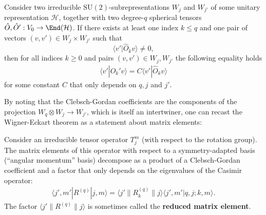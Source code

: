     \begin{theorem}
        Consider two irreducible $\mathrm{SU}(2)$-subrepresentations $W_j$ and $W_{j'}$ of some unitary representation $\mathcal{H}$, together with two degree-$q$ spherical tensors $\hat{O},\hat{O}':V_0\rightarrow\End(\mathcal{H})$. If there exists at least one index $k\leq q$ and one pair of vectors $(v,v')\in W_j\times W_{j'}$ such that \[\langle v'|\hat{O}_kv\rangle\neq 0,\] then for all indices $k\geq 0$ and pairs $(v,v')\in W_j,W_{j'}$ the following equality holds
        \begin{gather}
            \langle v'|\hat{O}_k'v\rangle = C\langle v'|\hat{O}_kv\rangle
        \end{gather}
        for some constant $C$ that only depends on $q,j$ and $j'$.
    \end{theorem}
    By noting that the Clebsch-Gordan coefficients are the components of the projection $W_q\otimes W_j\rightarrow W_{j'}$, which is itself an intertwiner, one can recast the Wigner-Eckart theorem as a statement about matrix elements:
    \begin{result}
        Consider an irreducible tensor operator $T_j^m$ (with respect to the rotation group). The matrix elements of this operator with respect to a symmetry-adapted basis (``angular momentum'' basis) decompose as a product of a Clebsch-Gordan coefficient and a factor that only depends on the eigenvalues of the Casimir operator:
        \begin{gather}
            \langle j',m'|R^{(q)}|j,m \rangle = \langle j'\|R_k^{(q)}\|j \rangle\langle j',m'|q,j;k,m \rangle.
        \end{gather}
        The factor $\langle j'\|R^{(q)}\|j \rangle$ is sometimes called the \textbf{reduced matrix element}.
    \end{result}